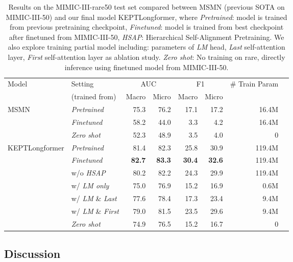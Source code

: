 \documentclass[11pt]{article}
\begin{document}
\begin{table*}
\centering
\begin{tabular}{l|l|rrrrrr}\toprule
\multirow{2}{*}{Model} &Setting &\multicolumn{2}{c}{AUC} &\multicolumn{2}{c}{F1} &\multirow{2}{*}{\# Train Param} \\\cmidrule{3-6}
&(trained from) &Macro &Micro &Macro &Micro & \\\midrule
\multirow{3}{*}{MSMN} & \textit{Pretrained}  &75.3 &76.2 &17.1 &17.2 &16.4M \\
&\textit{Finetuned} &58.2 &44.0 &3.3 &4.2 &16.4M \\
&\textit{Zero shot} &52.3 &48.9 &3.5 &4.0 &0 \\
\hline
\multirow{7}{*}{KEPTLongformer} &\textit{Pretrained} &81.4 &82.3 &25.8 &30.9 &119.4M \\
&\textit{Finetuned} &\textbf{82.7} &\textbf{83.3} &\textbf{30.4} &\textbf{32.6} &119.4M \\
& \hspace{3mm} w/o \textit{HSAP} &80.2 &82.2 &24.3 &29.9 &119.4M \\
& \hspace{3mm} w/ \textit{LM only} &75.0 &76.9 &15.2 &16.9&0.6M \\
& \hspace{3mm} w/ \textit{LM} \& \textit{Last} &77.6 &78.4 &17.3 &23.4 &9.4M \\
& \hspace{3mm} w/ \textit{LM} \& \textit{First}  &79.0 &81.5 &23.5 &29.6 &9.4M \\
&\textit{Zero shot} &74.9 &76.5 &15.2 &16.7 &0 \\ 
\bottomrule
\end{tabular}
\caption{Results on the MIMIC-III-rare50 test set compared between MSMN (previous SOTA on MIMIC-III-50) and our final model KEPTLongformer, where \textit{Pretrained}: model is trained from previous pretraining checkpoint, \textit{Finetuned}: model is trained from best checkpoint after finetuned from MIMIC-III-50, \textit{HSAP}: Hierarchical Self-Alignment Pretraining. We also explore training partial model including: parameters of \textit{LM} head, \textit{Last} self-attention layer, \textit{First} self-attention layer as ablation study. \textit{Zero shot}: No training on rare, directly inference using finetuned model from MIMIC-III-50.}\label{tab:result_rare}
\end{table*}

\subsection{Discussion}
\end{document}
